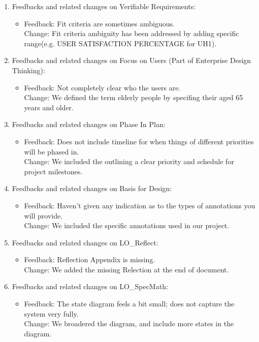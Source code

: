 \documentclass{article}
\begin{document}
\begin{enumerate}
\begin{itemize}
    \end{itemize}
    \item Feedbacks and related changes on Verifiable Requirements:
    \begin{itemize}
        \item Feedback: Fit criteria are sometimes ambiguous.\\
                Change: Fit criteria ambiguity has been addressed by adding specific range(e.g. USER SATISFACTION PERCENTAGE for UH1).
    \end{itemize}
    \item Feedbacks and related changes on Focus on Users (Part of Enterprise Design Thinking):
    \begin{itemize}
        \item Feedback: Not completely clear who the users are.\\
                Change: We defined the term elderly people by specifing their aged 65 years and older. 
    \end{itemize}
    \item Feedbacks and related changes on Phase In Plan:
    \begin{itemize}
        \item Feedback: Does not include timeline for when things of different priorities will be phased in.\\
                Change: We included the outlining a clear priority and schedule for project milestones.
    \end{itemize}
    \item Feedbacks and related changes on Basis for Design:
    \begin{itemize}
        \item Feedback: Haven't given any indication as to the types of annotations you will provide.\\
                Change: We included the specific annotations used in our project.
    \end{itemize}
    \item Feedbacks and related changes on LO\_Reflect:
    \begin{itemize}
        \item Feedback: Reflection Appendix is missing.\\
                Change: We added the missing Relection at the end of document.
    \end{itemize}
    \item Feedbacks and related changes on LO\_SpecMath:
    \begin{itemize}
        \item Feedback: The state diagram feels a bit small; does not capture the system very fully.\\
                Change: We broadered the diagram, and include more states in the diagram.
    \end{itemize}
\end{enumerate}
\end{document}
